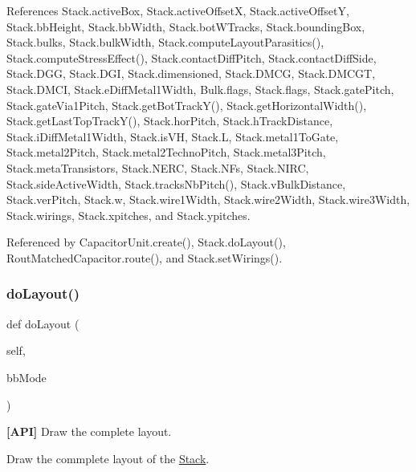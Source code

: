 References Stack.\+active\+Box, Stack.\+active\+OffsetX, Stack.\+active\+OffsetY, Stack.\+bb\+Height, Stack.\+bb\+Width, Stack.\+bot\+W\+Tracks, Stack.\+bounding\+Box, Stack.\+bulks, Stack.\+bulk\+Width, Stack.\+compute\+Layout\+Parasitics(), Stack.\+compute\+Stress\+Effect(), Stack.\+contact\+Diff\+Pitch, Stack.\+contact\+Diff\+Side, Stack.\+D\+GG, Stack.\+D\+GI, Stack.\+dimensioned, Stack.\+D\+M\+CG, Stack.\+D\+M\+C\+GT, Stack.\+D\+M\+CI, Stack.\+e\+Diff\+Metal1\+Width, Bulk.\+flags, Stack.\+flags, Stack.\+gate\+Pitch, Stack.\+gate\+Via1\+Pitch, Stack.\+get\+Bot\+Track\+Y(), Stack.\+get\+Horizontal\+Width(), Stack.\+get\+Last\+Top\+Track\+Y(), Stack.\+hor\+Pitch, Stack.\+h\+Track\+Distance, Stack.\+i\+Diff\+Metal1\+Width, Stack.\+is\+VH, Stack.\+L, Stack.\+metal1\+To\+Gate, Stack.\+metal2\+Pitch, Stack.\+metal2\+Techno\+Pitch, Stack.\+metal3\+Pitch, Stack.\+meta\+Transistors, Stack.\+N\+E\+RC, Stack.\+N\+Fs, Stack.\+N\+I\+RC, Stack.\+side\+Active\+Width, Stack.\+tracks\+Nb\+Pitch(), Stack.\+v\+Bulk\+Distance, Stack.\+ver\+Pitch, Stack.\+w, Stack.\+wire1\+Width, Stack.\+wire2\+Width, Stack.\+wire3\+Width, Stack.\+wirings, Stack.\+xpitches, and Stack.\+ypitches.



Referenced by Capacitor\+Unit.\+create(), Stack.\+do\+Layout(), Rout\+Matched\+Capacitor.\+route(), and Stack.\+set\+Wirings().

\mbox{\label{classpython_1_1stack_1_1Stack_a2b936db85a32775dd3739ccfdfef636d}} 
\subsubsection{\texorpdfstring{do\+Layout()}{doLayout()}}
{\footnotesize\ttfamily def do\+Layout (\begin{DoxyParamCaption}\item[{}]{self,  }\item[{}]{bb\+Mode }\end{DoxyParamCaption})}



{\bfseries \mbox{[}A\+PI\mbox{]}} Draw the complete layout. 

Draw the commplete layout of the \mbox{\hyperlink{classpython_1_1stack_1_1Stack}{Stack}}. 

